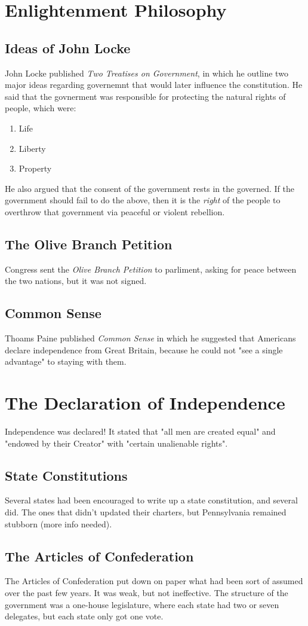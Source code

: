 \section{Enlightenment Philosophy}
\subsection{Ideas of John Locke}
John Locke published \textit{Two Treatises on Government}, in which he outline
two major ideas regarding governemnt that would later influence the
constitution.  He said that the govnerment was responsible for protecting the
natural rights of people, which were:

\begin{enumerate}
  \item Life
  \item Liberty
  \item Property
\end{enumerate}

He also argued that the consent of the government rests in the governed.  If the
government should fail to do the above, then it is the \textit{right} of the
people to overthrow that government via peaceful or violent rebellion.

\subsection{The Olive Branch Petition}
Congress sent the \textit{Olive Branch Petition} to parliment, asking for peace
between the two nations, but it was not signed.

\subsection{Common Sense}
Thoams Paine published \textit{Common Sense} in which he suggested that
Americans declare independence from Great Britain, because he could not "see a
single advantage" to staying with them.

\section{The Declaration of Independence}
Independence was declared!  It stated that "all men are created equal" and
"endowed by their Creator" with "certain unalienable rights".

\subsection{State Constitutions}
Several states had been encouraged to write up a state constitution, and several
did.  The ones that didn't updated their charters, but Pennsylvania remained
stubborn (more info needed).

\subsection{The Articles of Confederation}
The Articles of Confederation put down on paper what had been sort of assumed
over the past few years.  It was weak, but not ineffective.  The structure of
the government was a one-house legislature, where each state had two or seven
delegates, but each state only got one vote.
